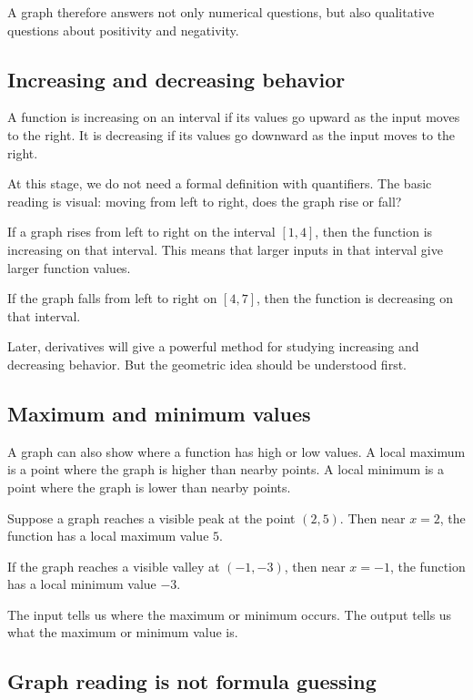 A graph therefore answers not only numerical questions, but also qualitative questions about positivity and negativity.

\subsection*{Increasing and decreasing behavior}

A function is increasing on an interval if its values go upward as the input moves to the right. It is decreasing if its values go downward as the input moves to the right.

At this stage, we do not need a formal definition with quantifiers. The basic reading is visual: moving from left to right, does the graph rise or fall?

\begin{examplebox}
If a graph rises from left to right on the interval \([1,4]\), then the function is increasing on that interval. This means that larger inputs in that interval give larger function values.

If the graph falls from left to right on \([4,7]\), then the function is decreasing on that interval.
\end{examplebox}

Later, derivatives will give a powerful method for studying increasing and decreasing behavior. But the geometric idea should be understood first.

\subsection*{Maximum and minimum values}

A graph can also show where a function has high or low values. A local maximum is a point where the graph is higher than nearby points. A local minimum is a point where the graph is lower than nearby points.

\begin{examplebox}
Suppose a graph reaches a visible peak at the point \((2,5)\). Then near \(x=2\), the function has a local maximum value \(5\).

If the graph reaches a visible valley at \((-1,-3)\), then near \(x=-1\), the function has a local minimum value \(-3\).
\end{examplebox}

The input tells us where the maximum or minimum occurs. The output tells us what the maximum or minimum value is.

\subsection*{Graph reading is not formula guessing}

